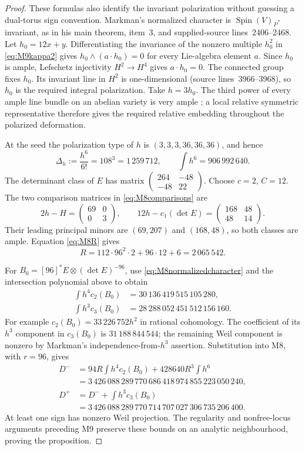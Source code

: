 \documentclass[11pt,a4paper]{article}
\theoremstyle{definition}\newtheorem{definition}[theorem]{Definition}
\theoremstyle{remark}\newtheorem{remark}[theorem]{Remark}
\begin{document}
\begin{proof}
These formulas also identify the invariant polarization without
guessing a dual-torus sign convention. Markman's normalized character
is $\operatorname{Spin}(V)_P$-invariant, as in his main theorem,
item~3, and supplied-source lines~2406--2468.
Let $h_0=12x+y$. Differentiating the invariance of the nonzero
multiple $h_0^2$ in \eqref{eq:M9kappa2} gives
$h_0\wedge(a\cdot h_0)=0$ for every Lie-algebra element $a$.
Since $h_0$ is ample, Lefschetz injectivity $H^2\to H^4$ gives
$a\cdot h_0=0$. The connected group fixes $h_0$.
Its invariant line in $H^2$ is one-dimensional
(source lines~3966--3968), so $h_0$ is the required integral
polarization. Take $h=3h_0$. The third power of every ample line bundle
on an abelian variety is very ample
\citep[Theorem~1.1(b)]{BauerSzemberg96}; a local relative symmetric
representative therefore gives the required relative embedding
throughout the polarized deformation.

At the seed the polarization type of $h$ is
$(3,3,3,36,36,36)$, and hence
\[
 \Delta_h:=\frac{h^6}{6!}=108^3=1\,259\,712,\qquad
 \int h^6=906\,992\,640.
\]
The determinant class of $E$ has matrix
$\left(\begin{smallmatrix}264&-48\\-48&22\end{smallmatrix}\right)$.
Choose $c=2$, $C=12$. The two comparison matrices in
\eqref{eq:M8comparisons} are
\[
 2h-H=\begin{pmatrix}69&0\\0&3\end{pmatrix},\qquad
 12h-c_1(\det E)=\begin{pmatrix}168&48\\48&14\end{pmatrix}.
\]
Their leading principal minors are $(69,207)$ and $(168,48)$,
so both classes are ample. Equation \eqref{eq:M8R} gives
\[
 R=112\cdot96^2\cdot2+96\cdot12+6=2\,065\,542.
\]

For $B_0=[96]^*E\otimes(\det E)^{-96}$, use
\eqref{eq:M8normalizedcharacter} and the intersection polynomial
above to obtain
\begin{align*}
 \int h^4c_2(B_0)&=30\,136\,419\,515\,105\,280,\\
 \int h^3c_3(B_0)&=28\,288\,052\,451\,512\,156\,160.
\end{align*}
For example $c_2(B_0)=33\,226\,752h^2$ in rational cohomology.
The coefficient of its $h^3$ component in $c_3(B_0)$ is
$31\,188\,844\,544$; the remaining Weil component is nonzero by
Markman's independence-from-$h^3$ assertion.
Substitution into M8, with $r=96$, gives
\begin{align*}
 D^-&=94R\int h^4c_2(B_0)+428640R^3\int h^6\\
    &=3\,426\,088\,289\,770\,686\,418\,974\,855\,223\,050\,240,\\
 D^+&=D^-+\int h^3c_3(B_0)\\
    &=3\,426\,088\,289\,770\,714\,707\,027\,306\,735\,206\,400.
\end{align*}
At least one sign has nonzero Weil projection.
The regularity and nonfree-locus arguments preceding M9 preserve
these bounds on an analytic neighbourhood, proving the proposition.


\end{proof}
\end{document}
